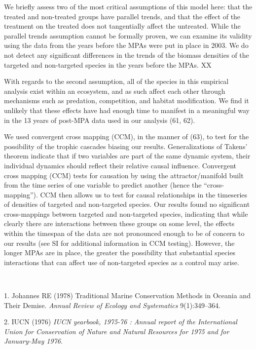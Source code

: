 \documentclass[9pt,twocolumn,twoside,lineno]{pnas-new}
\begin{document}
We briefly assess two of the most critical assumptions of this model
here: that the treated and non-treated groups have parallel trends, and
that the effect of the treatment on the treated does not tangentially
affect the untreated. While the parallel trends assumption cannot be
formally proven, we can examine its validity using the data from the
years before the MPAs were put in place in 2003. We do not detect any
significant differences in the trends of the biomass densities of the
targeted and non-targeted species in the years before the MPAs. XX

With regards to the second assumption, all of the species in this
empirical analysis exist within an ecosystem, and as such affect each
other through mechanisms such as predation, competition, and habitat
modification. We find it unlikely that these effects have had enough
time to manifest in a meaningful way in the 13 years of post-MPA data
used in our analysis (61, 62).

We used convergent cross mapping (CCM), in the manner of (63), to test
for the possibility of the trophic cascades biasing our results.
Generalizations of Takens' theorem indicate that if two variables are
part of the same dynamic system, their individual dynamics should
reflect their relative causal influence. Convergent cross mapping (CCM)
tests for causation by using the attractor/manifold built from the time
series of one variable to predict another (hence the ``cross-mapping'').
CCM then allows us to test for causal relationships in the timeseries of
densities of targeted and non-targeted species. Our results found no
significant cross-mappings between targeted and non-targeted species,
indicating that while clearly there are interactions between these
groups on some level, the effects within the timespan of the data are
not pronounced enough to be of concern to our results (see SI for
additional information in CCM testing). However, the longer MPAs are in
place, the greater the possibility that substantial species interactions
that can affect use of non-targeted species as a control may arise.

~ ~ ~

\hypertarget{refs}{}
\leavevmode\hypertarget{ref-johannes1978}{}%
1. Johannes RE (1978) Traditional Marine Conservation Methods in Oceania
and Their Demise. \emph{Annual Review of Ecology and Systematics}
9(1):349--364.

\leavevmode\hypertarget{ref-iucn1976}{}%
2. IUCN (1976) \emph{IUCN yearbook, 1975-76 : Annual report of the
International Union for Conservation of Nature and Natural Resources for
1975 and for January-May 1976}.
\end{document}
